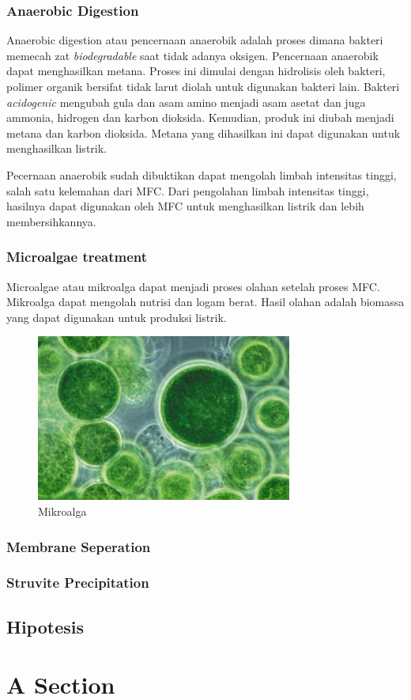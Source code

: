 \documentclass[10pt,a4paper,hidelinks]{article}
\begin{document}
    \subsubsection{Anaerobic Digestion}
    Anaerobic digestion atau pencernaan anaerobik adalah proses dimana bakteri memecah zat \textit{biodegradable} saat tidak adanya oksigen. Pencernaan anaerobik dapat menghasilkan metana. Proses ini dimulai dengan hidrolisis oleh bakteri, polimer organik bersifat tidak larut diolah untuk digunakan bakteri lain. Bakteri \textit{acidogenic} mengubah gula dan asam amino menjadi asam asetat dan juga ammonia, hidrogen dan karbon dioksida. Kemudian, produk ini diubah menjadi metana dan karbon dioksida. Metana yang dihasilkan ini dapat digunakan untuk menghasilkan listrik.
    
Pecernaan anaerobik sudah dibuktikan dapat mengolah limbah intensitas tinggi, salah satu kelemahan dari MFC. Dari pengolahan limbah intensitas tinggi, hasilnya dapat digunakan oleh MFC untuk menghasilkan listrik dan lebih membersihkannya.
    \subsubsection{Microalgae treatment}
    Microalgae atau mikroalga dapat menjadi proses olahan setelah proses MFC. Mikroalga dapat mengolah nutrisi dan logam berat. Hasil olahan adalah biomassa yang dapat digunakan untuk produksi listrik.
    
	\begin{figure}[!ht]
	  \centering
		  \includegraphics[width=0.75\textwidth]{gfx/microalgae}
	  \caption{Mikroalga}
	\end{figure}

    \subsubsection{Membrane Seperation}
    \subsubsection{Struvite Precipitation}
    \subsection{Hipotesis}
    \section{A Section}
    \lipsum[1]
    
    \nocite{*}
    
    
\end{document}
